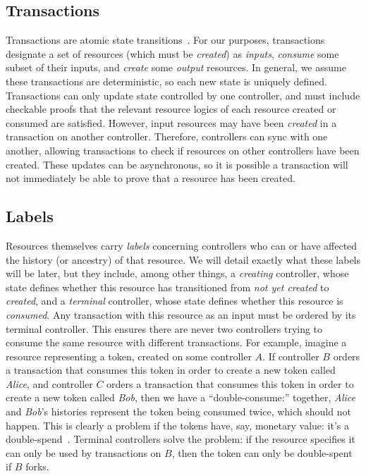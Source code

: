 \documentclass[a4paper,USenglish,cleveref, autoref, thm-restate, anonymous]{lipics-v2021}
\begin{document}
\subsection{Transactions}
Transactions are atomic state transitions~\cite{smr,statemachine}.
For our purposes, transactions designate a set of resources (which must be \emph{created}) as \emph{inputs}, \emph{consume} some subset of their inputs, and \emph{create} some \emph{output} resources.
In general, we assume these transactions are deterministic, so each new state is uniquely defined.
Transactions can only update state controlled by one controller, and must include checkable proofs that the relevant resource logics of each resource created or consumed are satisfied.
However, input resources may have been \emph{created} in a transaction on another controller.
Therefore, controllers can sync with one another, allowing transactions to check if resources on other controllers have been created.
These updates can be asynchronous, so it is possible a transaction will not immediately be able to prove that a resource has been created.

\subsection{Labels}
Resources themselves carry \emph{labels} concerning controllers who can or have affected the history (or ancestry) of that resource.
We will detail exactly what these labels will be later, but they include, among other things,
 a \emph{creating} controller, whose state defines whether this resource has transitioned from \emph{not yet created} to \emph{created}, and a \emph{terminal} controller, whose state defines whether this resource is \emph{consumed}.
Any transaction with this resource as an input must be ordered by its terminal controller.
This ensures there are never two controllers trying to consume the same resource with different transactions.
For example, imagine a resource representing a token, created on some controller $A$.
If controller $B$ orders a transaction that consumes this token in order to create a new token called \emph{Alice}, and controller $C$ orders a transaction that consumes this token in order to create a new token called \emph{Bob}, then we have a ``double-consume:'' together, \emph{Alice} and \emph{Bob}'s histories represent the token being consumed twice, which should not happen.
This is clearly a problem if the tokens have, say, monetary value: it's a double-spend~\cite{bitcoin}.
Terminal controllers solve the problem: if the resource specifies it can only be used by transactions on $B$, then the token can only be double-spent if $B$ forks.
\end{document}
